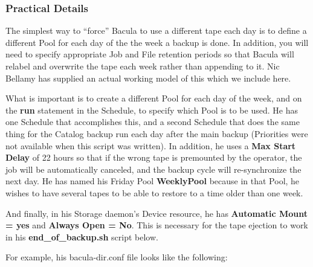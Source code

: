 \subsubsection*{Practical Details}

The simplest way to ``force'' Bacula to use a different tape each day is to
define a different Pool for each day of the the week a backup is done. In
addition, you will need to specify appropriate Job and File retention periods
so that Bacula will relabel and overwrite the tape each week rather than
appending to it. Nic Bellamy has supplied an actual working model of this
which we include here. 

What is important is to create a different Pool for each day of the week, and
on the {\bf run} statement in the Schedule, to specify which Pool is to be
used. He has one Schedule that accomplishes this, and a second Schedule that
does the same thing for the Catalog backup run each day after the main backup
(Priorities were not available when this script was written). In addition, he
uses a {\bf Max Start Delay} of 22 hours so that if the wrong tape is
premounted by the operator, the job will be automatically canceled, and the
backup cycle will re-synchronize the next day. He has named his Friday Pool
{\bf WeeklyPool} because in that Pool, he wishes to have several tapes to be
able to restore to a time older than one week. 

And finally, in his Storage daemon's Device resource, he has {\bf Automatic
Mount = yes} and {\bf Always Open = No}. This is necessary for the tape
ejection to work in his {\bf end\_of\_backup.sh} script below. 

For example, his bacula-dir.conf file looks like the following: 

